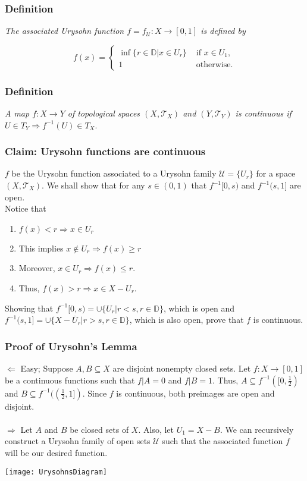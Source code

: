 \documentclass[12pt]{article}
\newcommand{\T}{\mathcal{T}} %
\newcommand{\D}{\mathbb{D}} %
\newcommand{\U}{\mathcal{U}} %
\begin{document}
\subsubsection*{Definition}
\textit{The associated Urysohn function $f = f_{\mathcal{U}} : X \rightarrow [0, 1]$ is defined by}

	\[
	f(x) = 
		\begin{cases}
			\inf \{r \in \D \vert x \in U_r\} & \text{ if } x \in U_1,\\
			1 & \text{ otherwise.}
		\end{cases}
	\]




\subsubsection*{Definition}
\textit{A map $f : X \rightarrow Y$ of topological spaces $(X, \T_X)$ and $(Y, \T_Y)$ is continuous if $U \in T_Y \Rightarrow f^{-1}(U) \in T_X$}.





\center\subsubsection*{Claim: Urysohn functions are continuous}
 $f$ be the Urysohn function associated to a Urysohn family $\U = \{U_r\}$ for a space $(X, \T_X)$. We shall show that for any $s \in (0, 1)$ that $f^{-1}[0, s)$ and $f^{-1}(s, 1]$ are open.\\
Notice that
	\begin{enumerate}
		\item $f(x) < r \Rightarrow x \in U_r$\\
		\item This implies $x \notin U_r \Rightarrow f(x) \geq r$\\
		\item Moreover, $x \in U_r \Rightarrow f(x) \leq r$.\\
		\item Thus, $f(x) > r \Rightarrow x \in X -  U_r$.
	\end{enumerate}
Showing that $f^{-1}[0, s) = \cup \{U_r \vert r < s, r \in \D\}$, which is open and $f^{-1}(s, 1] = \cup \{X - \overline{U}_r \vert r > s, r \in \D\}$, which is also open, prove that $f$ is continuous.





\center\subsubsection*{Proof of Urysohn's Lemma}
\flushleft
$\boxed{\Leftarrow}$ Easy; Suppose $A, B \subseteq X$ are disjoint nonempty closed sets. Let $f : X \rightarrow [0, 1]$ be a continuous functions such that $f | A = 0$ and $f | B = 1$. Thus, $A \subseteq f^{-1}([0, \frac{1}{2})$ and $B \subseteq f^{-1}((\frac{1}{2}, 1])$. Since $f$ is continuous, both preimages are open and disjoint. \\~\\

$\boxed{\Rightarrow}$ Let $A$ and $B$ be closed sets of $X$. Also, let $U_1 = X - B$. We can recursively construct a Urysohn family of open sets $\U$ such that the associated function $f$ will be our desired function. 

\begin{center}
	\texttt{[image: UrysohnsDiagram]}
\end{center}
\end{document}
